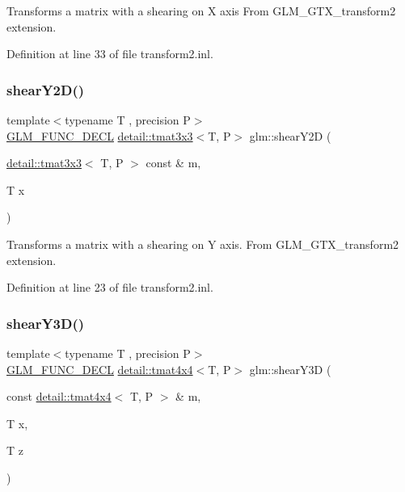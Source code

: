Transforms a matrix with a shearing on X axis From G\+L\+M\+\_\+\+G\+T\+X\+\_\+transform2 extension. 

Definition at line 33 of file transform2.\+inl.

\mbox{\label{group__gtx__transform2_ga1f5e68ada7a56cdf86c0c56d0b0a1832}} 
\subsubsection{\texorpdfstring{shear\+Y2\+D()}{shearY2D()}}
{\footnotesize\ttfamily template$<$typename T , precision P$>$ \\
\hyperlink{setup_8hpp_ab2d052de21a70539923e9bcbf6e83a51}{G\+L\+M\+\_\+\+F\+U\+N\+C\+\_\+\+D\+E\+CL} \hyperlink{structglm_1_1detail_1_1tmat3x3}{detail\+::tmat3x3}$<$T, P$>$ glm\+::shear\+Y2D (\begin{DoxyParamCaption}\item[{\hyperlink{structglm_1_1detail_1_1tmat3x3}{detail\+::tmat3x3}$<$ T, P $>$ const \&}]{m,  }\item[{T}]{x }\end{DoxyParamCaption})}

Transforms a matrix with a shearing on Y axis. From G\+L\+M\+\_\+\+G\+T\+X\+\_\+transform2 extension. 

Definition at line 23 of file transform2.\+inl.

\mbox{\label{group__gtx__transform2_ga4b5af90ecf76d312bb371f6111e1ae35}} 
\subsubsection{\texorpdfstring{shear\+Y3\+D()}{shearY3D()}}
{\footnotesize\ttfamily template$<$typename T , precision P$>$ \\
\hyperlink{setup_8hpp_ab2d052de21a70539923e9bcbf6e83a51}{G\+L\+M\+\_\+\+F\+U\+N\+C\+\_\+\+D\+E\+CL} \hyperlink{structglm_1_1detail_1_1tmat4x4}{detail\+::tmat4x4}$<$T, P$>$ glm\+::shear\+Y3D (\begin{DoxyParamCaption}\item[{const \hyperlink{structglm_1_1detail_1_1tmat4x4}{detail\+::tmat4x4}$<$ T, P $>$ \&}]{m,  }\item[{T}]{x,  }\item[{T}]{z }\end{DoxyParamCaption})}

